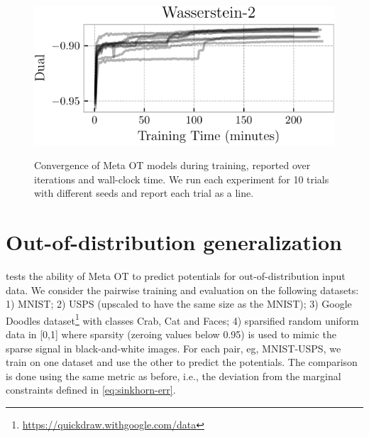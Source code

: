 \documentclass{article}
\newcommand{\ie}{i.e.\xspace}
\begin{document}
\begin{figure}[H]
    \includegraphics[width=.49\linewidth]{fig/color-training-time.pdf}
    \label{fig:training_info}
    \caption{Convergence of Meta OT models during training, reported over
      iterations and wall-clock time. We run each experiment for 10 trials
      with different seeds and report each trial as a line.}
\end{figure}


\newpage
\section{Out-of-distribution generalization}
 tests the ability of Meta OT to
predict potentials for out-of-distribution input data.
We consider the pairwise training and evaluation on the following datasets:
1) MNIST; 2) USPS \citep{uspsdataset} (upscaled to have the same size as the MNIST);
3) Google Doodles dataset\footnote{\url{https://quickdraw.withgoogle.com/data}}
with classes Crab, Cat and Faces;
4) sparsified random uniform data in [0,1] where
sparsity (zeroing values below 0.95) is used to mimic the sparse
signal in black-and-white images.
For each pair, eg, MNIST-USPS, we train on one dataset and use the other
to predict the potentials.
The comparison is done using the same metric as before, \ie,
the deviation from the marginal constraints
defined in \cref{eq:sinkhorn-err}.
\end{document}
